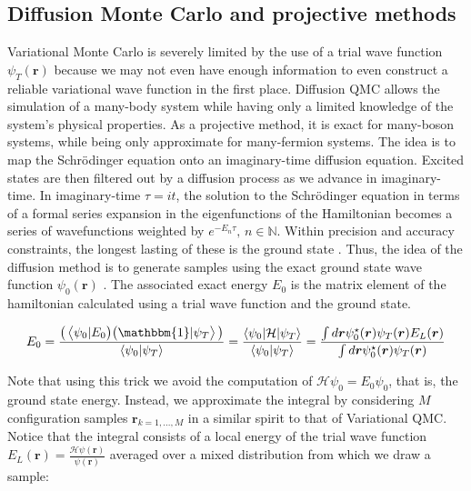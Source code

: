 \subsection{Diffusion Monte Carlo and projective methods}\label{subsec:dmc}

Variational Monte Carlo is severely limited by the use of a trial wave function $\psi_T (\bm r)$ because we may not even have enough information to even construct a reliable variational wave function in the first place.
Diffusion \ac{QMC} allows the simulation of a many-body system while having only a limited knowledge of the system's physical properties.
As a projective method, it is exact for many-boson systems, while being only approximate for many-fermion systems.
The idea is to map the Schr\"odinger equation onto an imaginary-time diffusion equation.
Excited states are then filtered out by a diffusion process as we advance in imaginary-time.
In imaginary-time $\tau = i t$, the solution to the Schr\"odinger equation in terms of a formal series expansion in the eigenfunctions of the Hamiltonian becomes a series of  wavefunctions weighted by $e^{-E_n \tau}, \, n \in \mathbb{N}$.
Within precision and accuracy constraints, the longest lasting of these is the ground state \cite{kosztin_introduction_1996}.
Thus, the idea of the diffusion method is to generate samples using the exact ground state wave function $\psi_0 (\bm r)$ \cite{toulouse_chapter_2016}.
The associated exact energy $E_0$ is the matrix element of the hamiltonian calculated using a trial wave function and the ground state.

\begin{equation}
E_0 = \frac{ \big( \left\langle \psi_0 |E_0 \big) \big( \mathbbm{1} | \psi_T \right\rangle \big)}{\left\langle \psi_0 | \psi_T \right\rangle} = \frac{\left\langle \psi_0 | \mathcal{H} | \psi_T \right\rangle}{ \left\langle\psi_0 | \psi_T \right\rangle} = \frac{\int d\bm r \psi_0^\star (\bm r) \psi_T (\bm r) E_L (\bm r)}{\int d\bm r\psi_0^\star (\bm r) \psi_T (\bm r)}
\end{equation}

Note that using this trick we avoid the computation of $\mathcal{H} \psi_0 = E_0 \psi_0$, that is, the ground state energy.
Instead, we approximate the integral by considering $M$ configuration samples $\bm r_{k = 1,..., M}$ in a similar spirit to that of Variational \ac{QMC}.
Notice that the integral consists of a local energy of the trial wave function $E_L (\bm r) = \frac{\mathcal{H} \psi (\bm r)}{\psi (\bm r)}$ averaged over a mixed distribution from which we draw a sample:

